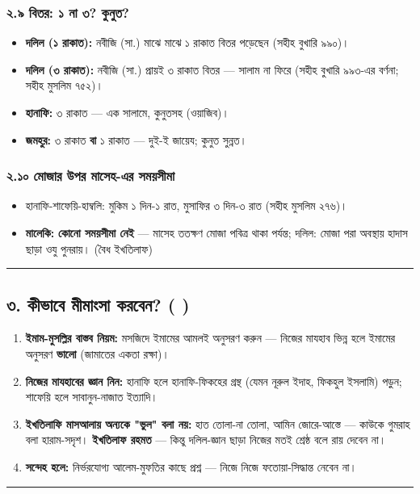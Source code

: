 \subsubsection*{২.৯ বিতর: ১ না ৩? কুনুত?}

\begin{itemize}
\item \textbf{দলিল (১ রাকাত):} নবীজি (সা.) মাঝে মাঝে ১ রাকাত বিতর পড়েছেন (সহীহ বুখারি ৯৯০)।
\item \textbf{দলিল (৩ রাকাত):} নবীজি (সা.) প্রায়ই ৩ রাকাত বিতর — সালাম না ফিরে (সহীহ বুখারি ৯৯৩-এর বর্ণনা; সহীহ মুসলিম ৭৫২)।
\item \textbf{হানাফি:} ৩ রাকাত — এক সালামে, কুনুতসহ (ওয়াজিব)।
\item \textbf{জমহুর:} ৩ রাকাত \textbf{বা} ১ রাকাত — দুই-ই জায়েয; কুনুত সুন্নত।
\end{itemize}
\subsubsection*{২.১০ মোজার উপর মাসেহ-এর সময়সীমা}

\begin{itemize}
\item হানাফি-শাফেয়ি-হাম্বলি: মুকিম ১ দিন-১ রাত, মুসাফির ৩ দিন-৩ রাত (সহীহ মুসলিম ২৭৬)।
\item \textbf{মালেকি:} \textbf{কোনো সময়সীমা নেই} — মাসেহ ততক্ষণ মোজা পবিত্র থাকা পর্যন্ত; দলিল: মোজা পরা অবস্থায় হাদাস ছাড়া ওযু পুনরায়। (বৈধ ইখতিলাফ)
\end{itemize}
\medskip\hrule\medskip

\subsection*{৩. কীভাবে মীমাংসা করবেন? ( )}

\begin{enumerate}
\item \textbf{ইমাম-মুসল্লির বাস্তব নিয়ম:} মসজিদে ইমামের আমলই অনুসরণ করুন — নিজের মাযহাব ভিন্ন হলে ইমামের অনুসরণ \textbf{ভালো} (জামাতের একতা রক্ষা)।
\item \textbf{নিজের মাযহাবের জ্ঞান নিন:} হানাফি হলে হানাফি-ফিকহের গ্রন্থ (যেমন নূরুল ইদাহ, ফিকহুল ইসলামি) পড়ুন; শাফেয়ি হলে সাবানুন-নাজাত ইত্যাদি।
\item \textbf{ইখতিলাফি মাসআলায় অন্যকে "ভুল" বলা নয়:} হাত তোলা-না তোলা, আমিন জোরে-আস্তে — কাউকে গুমরাহ বলা হারাম-সদৃশ। \textbf{ইখতিলাফ রহমত} — কিন্তু দলিল-জ্ঞান ছাড়া নিজের মতই শ্রেষ্ঠ বলে রায় দেবেন না।
\item \textbf{সন্দেহ হলে:} নির্ভরযোগ্য আলেম-মুফতির কাছে প্রশ্ন — নিজে নিজে ফতোয়া-সিদ্ধান্ত নেবেন না।
\end{enumerate}
\medskip\hrule\medskip

